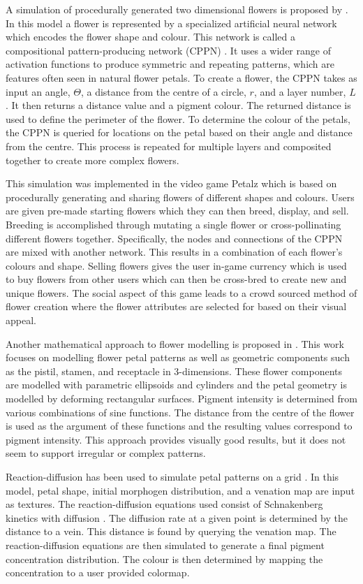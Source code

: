 A simulation of procedurally generated two dimensional flowers is proposed by \citep{risi2012}. In this model a flower is represented by a specialized artificial neural network which encodes the flower shape and colour. This network is called a compositional pattern-producing network (CPPN) \citep{stanley2007}. It uses a wider range of activation functions to produce symmetric and repeating patterns, which are features often seen in natural flower petals. To create a flower, the CPPN takes as input an angle, $\Theta$, a distance from the centre of a circle, $r$, and a layer number, $L$. It then returns a distance value and a pigment colour. The returned distance is used to define the perimeter of the flower. To determine the colour of the petals, the CPPN is queried for locations on the petal based on their angle and distance from the centre. This process is repeated for multiple layers and composited together to create more complex flowers. 

This simulation was implemented in the video game Petalz which is based on procedurally generating and sharing flowers of different shapes and colours. Users are given pre-made starting flowers which they can then breed, display, and sell. Breeding is accomplished through mutating a single flower or cross-pollinating different flowers together. Specifically, the nodes and connections of the CPPN are mixed with another network. This results in a combination of each flower's colours and shape. Selling flowers gives the user in-game currency which is used to buy flowers from other users which can then be cross-bred to create new and unique flowers. The social aspect of this game leads to a crowd sourced method of flower creation where the flower attributes are selected for based on their visual appeal.

Another mathematical approach to flower modelling is proposed in \citep{lu2014}. This work focuses on modelling flower petal patterns as well as geometric components such as the pistil, stamen, and receptacle in 3-dimensions. These flower components are modelled with parametric ellipsoids and cylinders and the petal geometry is modelled by deforming rectangular surfaces. Pigment intensity is determined from various combinations of sine functions. The distance from the centre of the flower is used as the argument of these functions and the resulting values correspond to pigment intensity. This approach provides visually good results, but it does not seem to support irregular or complex patterns.

Reaction-diffusion has been used to simulate petal patterns on a grid \citep{Zhou2007}. In this model, petal shape, initial morphogen distribution, and a venation map are input as textures. The reaction-diffusion equations used consist of Schnakenberg kinetics with diffusion \citep{schnakenberg1979}. The diffusion rate at a given point is determined by the distance to a vein. This distance is found by querying the venation map. The reaction-diffusion equations are then simulated to generate a final pigment concentration distribution. The colour is then determined by mapping the concentration to a user provided colormap.

